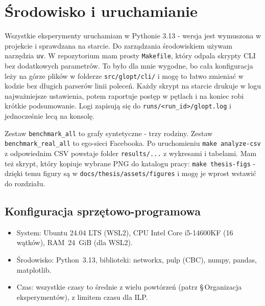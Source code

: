 \section{Środowisko i uruchamianie}
Wszystkie eksperymenty uruchamiam w Pythonie 3.13 - wersja jest wymuszona w projekcie i sprawdzana na starcie. Do zarządzania środowiskiem używam narzędzia \texttt{uv}. W repozytorium mam prosty \texttt{Makefile}, który odpala skrypty CLI bez dodatkowych parametrów. To było dla mnie wygodne, bo cała konfiguracja leży na górze plików w folderze \texttt{src/glopt/cli/} i mogę to łatwo zmieniać w kodzie bez długich parserów linii poleceń. Każdy skrypt na starcie drukuje w logu najważniejsze ustawienia, potem raportuje postęp w pętlach i na koniec robi krótkie podsumowanie. Logi zapisują się do \texttt{runs/<run\_id>/glopt.log} i jednocześnie lecą na konsolę.

Zestaw \texttt{benchmark\_all} to grafy syntetyczne - trzy rodziny. Zestaw \texttt{benchmark\_real\_all} to ego-sieci Facebooka. Po uruchomieniu \texttt{make analyze-csv} z odpowiednim CSV powstaje folder \texttt{results/...} z wykresami i tabelami. Mam też skrypt, który kopiuje wybrane PNG do katalogu pracy: \texttt{make thesis-figs} - dzięki temu figury są w \texttt{docs/thesis/assets/figures} i mogę je wprost wstawić do rozdziału.

\subsection*{Konfiguracja sprzętowo-programowa}
\begin{itemize}
  \item System: Ubuntu 24.04 LTS (WSL2), CPU Intel Core i5-14600KF (16 wątków), RAM~24~GiB (dla WSL2).
  \item Środowisko: Python~3.13, biblioteki: networkx, pulp (CBC), numpy, pandas, matplotlib.
  \item Czas: wszystkie czasy to średnie z wielu powtórzeń (patrz \S\,Organizacja eksperymentów), z limitem czasu dla ILP.
\end{itemize}


